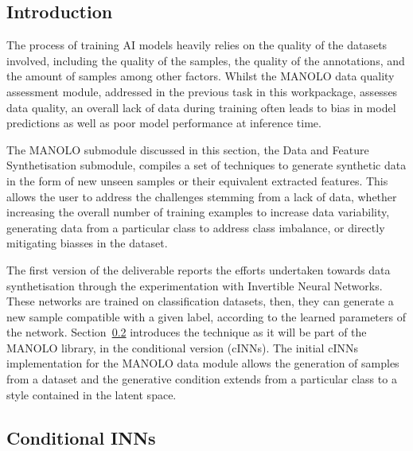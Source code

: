 \subsection{Introduction}\label{subsec:2.3_intro}
The process of training AI models heavily relies on the quality of the datasets involved, including the quality of the samples, the quality of the annotations, and the amount of samples among other factors. Whilst the MANOLO data quality assessment module, addressed in the previous task in this workpackage, assesses data quality, an overall lack of data during training often leads to bias in model predictions as well as poor model performance at inference time. 

The MANOLO submodule discussed in this section, the Data and Feature Synthetisation submodule, compiles a set of techniques to generate synthetic data in the form of new unseen samples or their equivalent extracted features. This allows the user to address the challenges stemming from a lack of data, whether increasing the overall number of training examples to increase data variability, generating data from a particular class to address class imbalance, or directly mitigating biasses in the dataset. 

The first version of the deliverable reports the efforts undertaken towards data synthetisation through the experimentation with Invertible Neural Networks. These networks are trained on classification datasets, then, they can generate a new sample compatible with a given label, according to the learned parameters of the network. Section~\ref{subsec:2.3_datasynth_tech1} introduces the technique as it will be part of the MANOLO library, in the conditional version (cINNs). The initial cINNs implementation for the MANOLO data module allows the generation of samples from a dataset and the generative condition extends from a particular class to a style contained in the latent space.

    \subsection{Conditional INNs}
    \label{subsec:2.3_datasynth_tech1}

